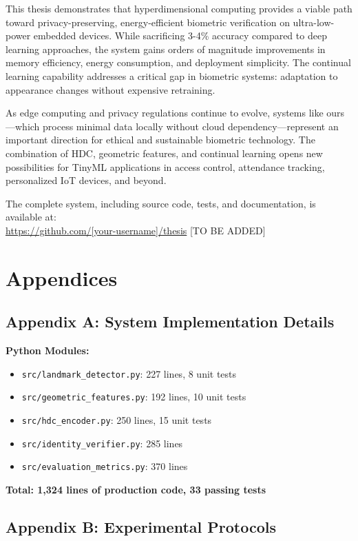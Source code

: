 \documentclass[a4paper,12pt]{article}
\begin{document}
This thesis demonstrates that hyperdimensional computing provides a viable path toward privacy-preserving, energy-efficient biometric verification on ultra-low-power embedded devices. While sacrificing 3-4\% accuracy compared to deep learning approaches, the system gains orders of magnitude improvements in memory efficiency, energy consumption, and deployment simplicity. The continual learning capability addresses a critical gap in biometric systems: adaptation to appearance changes without expensive retraining.

As edge computing and privacy regulations continue to evolve, systems like ours—which process minimal data locally without cloud dependency—represent an important direction for ethical and sustainable biometric technology. The combination of HDC, geometric features, and continual learning opens new possibilities for TinyML applications in access control, attendance tracking, personalized IoT devices, and beyond.

The complete system, including source code, tests, and documentation, is available at:\\
\url{https://github.com/[your-username]/thesis} [TO BE ADDED]

\newpage

\section{Appendices}

\subsection{Appendix A: System Implementation Details}

\textbf{Python Modules:}
\begin{itemize}
    \item \texttt{src/landmark\_detector.py}: 227 lines, 8 unit tests
    \item \texttt{src/geometric\_features.py}: 192 lines, 10 unit tests
    \item \texttt{src/hdc\_encoder.py}: 250 lines, 15 unit tests
    \item \texttt{src/identity\_verifier.py}: 285 lines
    \item \texttt{src/evaluation\_metrics.py}: 370 lines
\end{itemize}

\textbf{Total: 1,324 lines of production code, 33 passing tests}

\subsection{Appendix B: Experimental Protocols}
\end{document}
